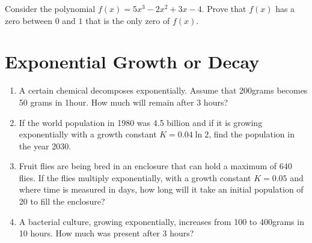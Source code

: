 \documentclass[12pt]{article}
\begin{document}
	Consider the polynomial $f(x) = 5x^3 - 2x^2 +3x -4$. Prove that $f(x)$ has a zero between $0$ and $1$ that is the only zero of $f(x)$.
	\vskip 6cm

	\section{Exponential Growth or Decay}
	\begin{enumerate}
		\item A certain chemical decomposes exponentially. Assume that 200grams becomes 50 grams in 1hour. How much
		will remain after 3 hours?
		\vskip 3cm
		\item If the world population in 1980 was 4.5 billion and if it is growing exponentially with a growth constant
		$K = 0.04 \ln 2$, find the population in the year 2030.
		\vskip 3cm
		\item Fruit flies are being bred in an enclosure that can hold a maximum of 640 flies. If the flies multiply exponentially, with a growth constant $K = 0.05$ and where time is measured in days, how long will it take an initial population
		of 20 to fill the enclosure?
		\vskip 4cm
		\item A bacterial culture, growing exponentially, increases from 100 to 400grams in 10 hours. How much was present
		after 3 hours?
	\end{enumerate}
\end{document}
